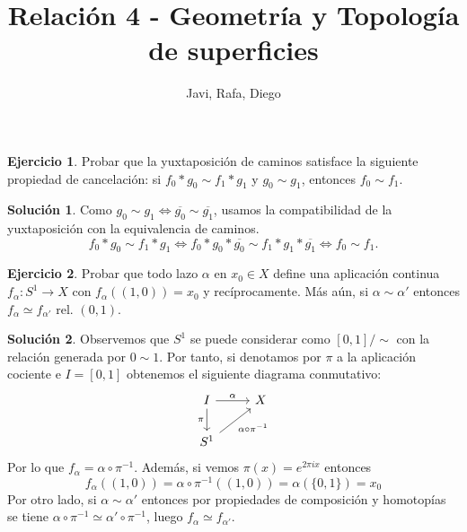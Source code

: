 \documentclass{article}
\theoremstyle{plain}
\theoremstyle{definition}
\newtheorem{exercise}{Ejercicio}
\newtheorem*{sol*}{Solución}
\begin{document}
\title{Relación 4 - Geometría y Topología de superficies }
\author{Javi, Rafa, Diego}
\maketitle
\begin{exercise} Probar que la yuxtaposición de caminos satisface la siguiente propiedad de cancelación: si $f_0*g_0 \sim f_1* g_1$ y $g_0 \sim g_1$, entonces $f_0 \sim f_1$.
\end{exercise}
\begin{sol*}
Como $g_0 \sim g_1\Leftrightarrow \overline{g_0}\sim\overline{g_1}$, usamos la compatibilidad de la yuxtaposición con la equivalencia de caminos.
\[
f_0*g_0 \sim f_1* g_1\Leftrightarrow f_0*g_0*\overline{g_0}\sim f_1*g_1*\overline{g_1}\Leftrightarrow f_0\sim f_1.
\]
\end{sol*}

\vspace{0.1cm}

\newpage \begin{exercise} \label{s1}Probar que todo lazo $\alpha$ en $x_0\in X$ define una aplicación continua $f_\alpha: S^1 \to X$ con $f_\alpha((1,0)) = x_0$ y recíprocamente. Más aún, si $\alpha \sim \alpha'$ entonces $f_{\alpha} \simeq f_{\alpha'} \mbox{ rel. } (0,1)$.
\end{exercise}
\begin{sol*}
Observemos que $S^1$ se puede considerar como $[0,1]/\sim$ con la relación generada por $0\sim 1$. Por tanto, si denotamos por $\pi$ a la aplicación cociente e $I=[0,1]$ obtenemos el siguiente diagrama conmutativo:
\[
\begin{tikzcd}
I\arrow[r,"\alpha"]\arrow[d,"\pi"'] & X\\
S^1\arrow[ur,"\alpha\circ\pi^{-1}"']
\end{tikzcd}
\]
Por lo que $f_\alpha=\alpha\circ\pi^{-1}$. Además, si vemos $\pi(x)=e^{2\pi i x}$ entonces
\[
f_\alpha((1,0))=\alpha\circ\pi^{-1}((1,0))=\alpha(\{0,1\})=x_0
\]
Por otro lado, si $\alpha\sim\alpha'$ entonces por propiedades de composición y homotopías se tiene $\alpha\circ\pi^{-1} \simeq \alpha'\circ\pi^{-1}$, luego $f_\alpha \simeq f_{\alpha'}$.
\end{sol*}

\vspace{0.1cm}
\end{document}
